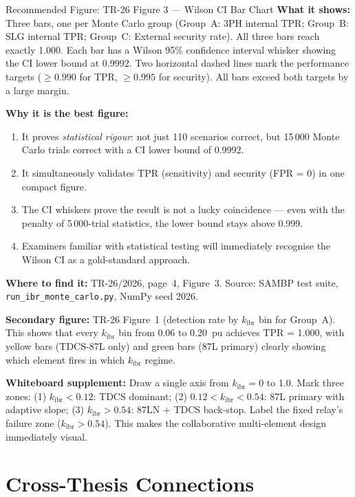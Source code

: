 \documentclass[12pt,a4paper]{article}
\newcommand{\kibr}{k_\mathrm{ibr}}
\begin{document}
\begin{keybox}{Recommended Figure: TR-26 Figure 3 --- Wilson CI Bar Chart}
\textbf{What it shows:} Three bars, one per Monte Carlo group (Group~A: 3PH internal TPR; Group~B: SLG internal TPR; Group~C: External security rate). All three bars reach exactly 1.000. Each bar has a Wilson 95\% confidence interval whisker showing the CI lower bound at 0.9992. Two horizontal dashed lines mark the performance targets ($\geq 0.990$ for TPR, $\geq 0.995$ for security). All bars exceed both targets by a large margin.

\textbf{Why it is the best figure:}
\begin{enumerate}[nosep]
  \item It proves \emph{statistical rigour}: not just 110 scenarios correct, but 15\,000 Monte Carlo trials correct with a CI lower bound of 0.9992.
  \item It simultaneously validates TPR (sensitivity) and security (FPR = 0) in one compact figure.
  \item The CI whiskers prove the result is not a lucky coincidence --- even with the penalty of 5\,000-trial statistics, the lower bound stays above 0.999.
  \item Examiners familiar with statistical testing will immediately recognise the Wilson CI as a gold-standard approach.
\end{enumerate}

\textbf{Where to find it:} TR-26/2026, page~4, Figure~3. Source: SAMBP test suite, \texttt{run\_ibr\_monte\_carlo.py}, NumPy seed 2026.

\textbf{Secondary figure:} TR-26 Figure~1 (detection rate by $\kibr$ bin for Group~A). This shows that every $\kibr$ bin from 0.06 to 0.20~pu achieves TPR = 1.000, with yellow bars (TDCS-87L only) and green bars (87L primary) clearly showing which element fires in which $\kibr$ regime.

\textbf{Whiteboard supplement:} Draw a single axis from $\kibr = 0$ to 1.0. Mark three zones: (1) $\kibr < 0.12$: TDCS dominant; (2) $0.12 < \kibr < 0.54$: 87L primary with adaptive slope; (3) $\kibr > 0.54$: 87LN + TDCS back-stop. Label the fixed relay's failure zone ($\kibr > 0.54$). This makes the collaborative multi-element design immediately visual.
\end{keybox}

\section{Cross-Thesis Connections}
\end{document}
